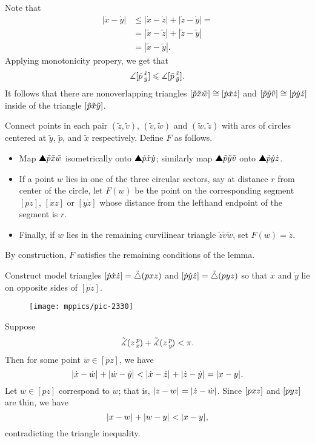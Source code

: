 Note that 
\begin{align*}
|\dot x-\dot y|&\le |\dot x-\dot z|+|\dot z-\dot y|=
\\
&=|\tilde  x-\tilde  z|+|\tilde  z-\tilde  y|
\\
&=|\tilde  x-\tilde  y|.
\end{align*}
Applying monotonicity propery, we get that
\[\measuredangle[\dot p\,{}^{\dot x}_{\dot y}]\leqslant \measuredangle[\tilde  p\,{}^{\tilde  x}_{\tilde  y}].\]
It follows that there are nonoverlapping triangles 
$[\tilde p{\tilde x}{\tilde w}]\cong[\dot p{\dot x}{\dot z}]$ 
and 
$[\tilde p{\tilde y}{\tilde v}]\cong[\dot p{\dot y}{\dot z}]$
 inside of the triangle $[\tilde p{\tilde x}{\tilde y}]$.


Connect points in each pair
$(\tilde z,\tilde v)$, 
$(\tilde v,\tilde w)$ 
and $(\tilde w,\tilde z)$ 
with arcs of circles centered at 
$\tilde y$, $\tilde p$, and $\tilde x$ respectively. 
Define $F$ as follows.
\begin{itemize}
\item Map  $\solidtriangle{\tilde p}{\tilde x}{\tilde w}$ isometrically onto  $\solidtriangle {\dot p}{\dot x}{\dot y}$;
similarly map $\solidtriangle{\tilde p}{\tilde y}{\tilde v}$ onto $\solidtriangle {\dot p}{\dot y}{\dot z}$.
\item If a point $w$ lies in one of the three circular sectors, say at distance $r$ from center of the circle, let $F(w)$ be the point on the corresponding segment 
$[\dot p \dot z]$, 
$[\dot x \dot z]$ 
or $[\dot y \dot z]$ whose distance from the lefthand endpoint of the segment is $r$.
\item Finally, if $w$ lies in the remaining curvilinear triangle $\tilde z \tilde v \tilde w$, 
set $F(w) =\dot z$. 
\end{itemize}
By construction, $F$ satisfies the remaining conditions of the lemma. 
\qeds


Construct model triangles $\trig{\dot p}{\dot x}{\dot z}\z=\modtrig(p x z)$ 
and $[\dot p{\dot y}{\dot z}]=\tilde\triangle(p y z)$ so that $\dot x$ and $\dot y$ lie on opposite sides of $[\dot p\dot z]$.

\begin{wrapfigure}{r}{30 mm}
\vskip-0mm
\centering
\texttt{[image: mppics/pic-2330]}
\end{wrapfigure}

Suppose
\[\tilde\measuredangle(z\,{}^{p}_{x}\hspace{-0.2ex})+\tilde\measuredangle(z\,{}^{p}_{y}\hspace{-0.2ex})
<
\pi.\]
Then for some point $\dot w\in[\dot p\dot z]$, we have \[\dist{\dot x}{\dot w}{}+\dist{\dot w}{\dot y}{}
<
\dist{\dot x}{\dot z}{}+\dist{\dot z}{\dot y}{}=\dist{x}{y}{}.\]
Let $w\in[p z]$ correspond to $\dot w$; that is, $\dist{z}{w}{}=\dist{\dot z}{\dot w}{}$. 
Since $[p{x}{z}]$ and $[p{y}{z}]$ are thin, we have 
\[\dist{x}{w}{}+\dist{w}{y}{}<\dist{x}{y}{},\]
contradicting the triangle inequality. 

